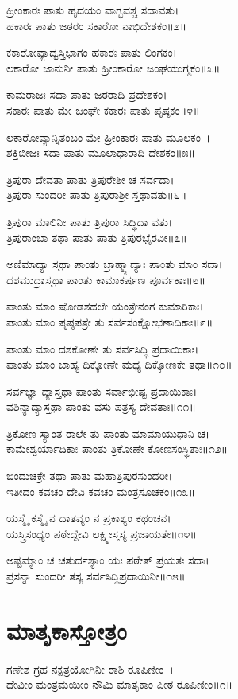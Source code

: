 ಹ್ರೀಂಕಾರಃ ಪಾತು ಹೃದಯಂ ವಾಗ್ಭವಶ್ಚ ಸದಾವತು।\\
ಹಕಾರಃ ಪಾತು ಜಠರಂ ಸಕಾರೋ ನಾಭಿದೇಶಕಂ॥೨॥

ಕಕಾರೋವ್ಯಾದ್ವಸ್ತಿಭಾಗಂ ಹಕಾರಃ ಪಾತು ಲಿಂಗಕಂ।\\
ಲಕಾರೋ ಜಾನುನೀ ಪಾತು ಹ್ರೀಂಕಾರೋ ಜಂಘಯುಗ್ಮಕಂ॥೩॥

ಕಾಮರಾಜಃ ಸದಾ ಪಾತು ಜಠರಾದಿ ಪ್ರದೇಶಕಂ।\\
ಸಕಾರಃ ಪಾತು ಮೇ ಜಂಘೇ ಕಕಾರಃ ಪಾತು ಪೃಷ್ಠಕಂ॥೪॥

ಲಕಾರೋವ್ಯಾನ್ನಿತಂಬಂ ಮೇ ಹ್ರೀಂಕಾರಃ ಪಾತು ಮೂಲಕಂ~।\\
ಶಕ್ತಿಬೀಜಃ ಸದಾ ಪಾತು ಮೂಲಾಧಾರಾದಿ ದೇಶಕಂ॥೫॥

ತ್ರಿಪುರಾ ದೇವತಾ ಪಾತು ತ್ರಿಪುರೇಶೀ ಚ ಸರ್ವದಾ।\\
ತ್ರಿಪುರಾ ಸುಂದರೀ ಪಾತು ತ್ರಿಪುರಾಶ್ರೀ ಸ್ತಥಾವತು॥೬॥

ತ್ರಿಪುರಾ ಮಾಲಿನೀ ಪಾತು ತ್ರಿಪುರಾ ಸಿದ್ಧಿದಾ ವತು।\\
ತ್ರಿಪುರಾಂಬಾ ತಥಾ ಪಾತು ಪಾತು ತ್ರಿಪುರಭೈರವೀ॥೭॥

ಅಣಿಮಾದ್ಯಾ ಸ್ತಥಾ ಪಾಂತು ಬ್ರಾಹ್ಮ್ಯಾದ್ಯಾಃ ಪಾಂತು ಮಾಂ ಸದಾ।\\
ದಶಮುದ್ರಾಸ್ತಥಾ ಪಾಂತು ಕಾಮಾಕರ್ಷಣ ಪೂರ್ವಕಾಃ॥೮॥

ಪಾಂತು ಮಾಂ ಷೋಡಶದಲೇ ಯಂತ್ರೇನಂಗ ಕುಮಾರಿಕಾಃ।\\
ಪಾಂತು ಮಾಂ ಪೃಷ್ಠಪತ್ರೇ ತು ಸರ್ವಸಂಕ್ಷೋಭಣಾದಿಕಾಃ॥೯॥

ಪಾಂತು ಮಾಂ ದಶಕೋಣೇ ತು ಸರ್ವಸಿದ್ಧಿ ಪ್ರದಾಯಿಕಾಃ।\\
ಪಾಂತು ಮಾಂ ಬಾಹ್ಯ ದಿಕ್ಕೋಣೇ ಮಧ್ಯ ದಿಕ್ಕೋಣಕೇ ತಥಾ॥೧೦॥

ಸರ್ವಜ್ಞಾ ದ್ಯಾಸ್ತಥಾ ಪಾಂತು ಸರ್ವಾಭೀಷ್ಟ ಪ್ರದಾಯಿಕಾಃ।\\
ವಶಿನ್ಯಾದ್ಯಾಸ್ತಥಾ ಪಾಂತು ವಸು ಪತ್ರಸ್ಯ ದೇವತಾಃ॥೧೧॥

ತ್ರಿಕೋಣ ಸ್ಯಾಂತ ರಾಲೇ ತು ಪಾಂತು ಮಾಮಾಯುಧಾನಿ ಚ।\\
ಕಾಮೇಶ್ವರ್ಯಾದಿಕಾಃ ಪಾಂತು ತ್ರಿಕೋಣೇ ಕೋಣಸಂಸ್ಥಿತಾಃ॥೧೨॥

ಬಿಂದುಚಕ್ರೇ ತಥಾ ಪಾತು ಮಹಾತ್ರಿಪುರಸುಂದರೀ।\\
ಇತೀದಂ ಕವಚಂ ದೇವಿ ಕವಚಂ ಮಂತ್ರಸೂಚಕಂ॥೧೩॥

ಯಸ್ಮೈ ಕಸ್ಮೈ ನ ದಾತವ್ಯಂ ನ ಪ್ರಕಾಶ್ಯಂ ಕಥಂಚನ।\\
ಯಸ್ತ್ರಿಸಂಧ್ಯಂ ಪಠೇದ್ದೇವಿ ಲಕ್ಷ್ಮೀಸ್ತಸ್ಯ ಪ್ರಜಾಯತೇ॥೧೪॥

ಅಷ್ಟಮ್ಯಾಂ ಚ ಚತುರ್ದಶ್ಯಾಂ ಯಃ ಪಠೇತ್ ಪ್ರಯತಃ ಸದಾ।\\
ಪ್ರಸನ್ನಾ ಸುಂದರೀ ತಸ್ಯ ಸರ್ವಸಿದ್ಧಿಪ್ರದಾಯಿನೀ॥೧೫॥
\section{ಮಾತೃಕಾಸ್ತೋತ್ರಂ}
ಗಣೇಶ ಗ್ರಹ ನಕ್ಷತ್ರಯೋಗಿನೀ ರಾಶಿ ರೂಪಿಣೀಂ~।\\
ದೇವೀಂ ಮಂತ್ರಮಯೀಂ ನೌಮಿ ಮಾತೃಕಾಂ ಪೀಠ ರೂಪಿಣೀಂ॥೧॥

